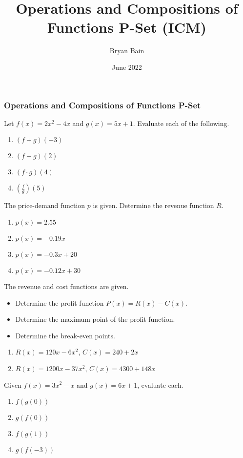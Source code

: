 \documentclass{article}
\title{Operations and Compositions of Functions P-Set (ICM)}
\author{Bryan Bain}
\date{June 2022}
\newcounter{pset}
\begin{document}
\subsubsection*{Operations and Compositions of Functions P-Set}

Let $f(x) = 2x^2 - 4x$ and $g(x) = 5x + 1$. Evaluate each of the following.
\begin{multicols}{4}
\begin{enumerate}
    \item $(f + g)(-3)$
    \item $(f - g)(2)$
    \item $(f \cdot g)(4)$
    \item $\left(\frac{f}{g}\right)(5)$
\end{enumerate}     \setcounter{pset}{\value{enumi}}
\end{multicols}

The price-demand function $p$ is given. Determine the revenue function $R$.
\begin{multicols}{4}
\begin{enumerate}     \setcounter{enumi}{\value{pset}}
    \item $p(x) = 2.55$
    \item $p(x) = -0.19x$
    \item $p(x) = -0.3x+20$
    \item $p(x) = -0.12x+30$
\end{enumerate}     \setcounter{pset}{\value{enumi}}
\end{multicols}

The revenue and cost functions are given. 
\begin{itemize}
    \item Determine the profit function $P(x) = R(x) - C(x)$. 
    \item Determine the maximum point of the profit function.
    \item Determine the break-even points.
\end{itemize}
\begin{multicols}{2}
\begin{enumerate}     \setcounter{enumi}{\value{pset}}
    \item $R(x) = 120x-6x^2$, $C(x) = 240+2x$
    \item $R(x) = 1200x - 37x^2$, $C(x) = 4300 + 148x$
\end{enumerate}     \setcounter{pset}{\value{enumi}}
\end{multicols}

Given $f(x) = 3x^2 - x$ and $g(x) = 6x + 1$, evaluate each.
\begin{multicols}{4}
\begin{enumerate}     \setcounter{enumi}{\value{pset}}
    \item $f(g(0))$
    \item $g(f(0))$
    \item $f(g(1))$
    \item $g(f(-3))$
\end{enumerate}     \setcounter{pset}{\value{enumi}}
\end{multicols}
\end{document}
